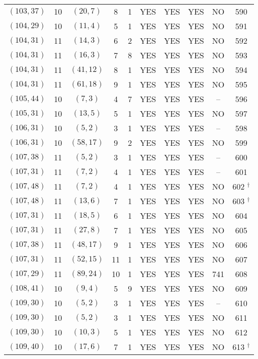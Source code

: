 \begin{longtable}{|c|c|c|c|c|c|c|c|c|c|}
$(103, 37)$ & 10 & $(20, 7)$ & 8 & 1 & YES & YES & YES & NO & 590\\
$(104, 29)$ & 10 & $(11, 4)$ & 5 & 1 & YES & YES & YES & NO & 591\\
$(104, 31)$ & 11 & $(14, 3)$ & 6 & 2 & YES & YES & YES & NO & 592\\
$(104, 31)$ & 11 & $(16, 3)$ & 7 & 8 & YES & YES & YES & NO & 593\\
$(104, 31)$ & 11 & $(41, 12)$ & 8 & 1 & YES & YES & YES & NO & 594\\
$(104, 31)$ & 11 & $(61, 18)$ & 9 & 1 & YES & YES & YES & NO & 595\\
$(105, 44)$ & 10 & $(7, 3)$ & 4 & 7 & YES & YES & YES & -- & 596\\
$(105, 31)$ & 10 & $(13, 5)$ & 5 & 1 & YES & YES & YES & NO & 597\\
$(106, 31)$ & 10 & $(5, 2)$ & 3 & 1 & YES & YES & YES & -- & 598\\
$(106, 31)$ & 10 & $(58, 17)$ & 9 & 2 & YES & YES & YES & NO & 599\\
$(107, 38)$ & 11 & $(5, 2)$ & 3 & 1 & YES & YES & YES & -- & 600\\
$(107, 31)$ & 11 & $(7, 2)$ & 4 & 1 & YES & YES & YES & -- & 601\\
$(107, 48)$ & 11 & $(7, 2)$ & 4 & 1 & YES & YES & YES & NO & 602 ${}^\dagger$\\
$(107, 48)$ & 11 & $(13, 6)$ & 7 & 1 & YES & YES & YES & NO & 603 ${}^\dagger$\\
$(107, 31)$ & 11 & $(18, 5)$ & 6 & 1 & YES & YES & YES & NO & 604\\
$(107, 31)$ & 11 & $(27, 8)$ & 7 & 1 & YES & YES & YES & NO & 605\\
$(107, 38)$ & 11 & $(48, 17)$ & 9 & 1 & YES & YES & YES & NO & 606\\
$(107, 31)$ & 11 & $(52, 15)$ & 11 & 1 & YES & YES & YES & NO & 607\\
$(107, 29)$ & 11 & $(89, 24)$ & 10 & 1 & YES & YES & YES & 741 & 608\\
$(108, 41)$ & 10 & $(9, 4)$ & 5 & 9 & YES & YES & YES & NO & 609\\
$(109, 30)$ & 10 & $(5, 2)$ & 3 & 1 & YES & YES & YES & -- & 610\\
$(109, 30)$ & 10 & $(5, 2)$ & 3 & 1 & YES & YES & YES & NO & 611\\
$(109, 30)$ & 10 & $(10, 3)$ & 5 & 1 & YES & YES & YES & NO & 612\\
$(109, 40)$ & 10 & $(17, 6)$ & 7 & 1 & YES & YES & YES & NO & 613 ${}^\dagger$\\

\end{longtable}

